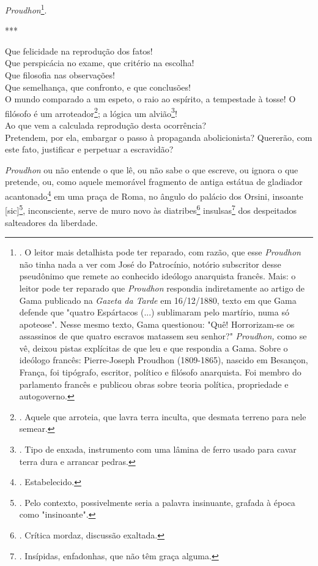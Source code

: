 \emph{Proudhon}\footnote{. O leitor mais detalhista pode ter reparado,
  com razão, que esse \emph{Proudhon} não tinha nada a ver com José do
  Patrocínio, notório subscritor desse pseudônimo que remete ao
  conhecido ideólogo anarquista francês. Mais: o leitor pode ter
  reparado que \emph{Proudhon} respondia indiretamente ao artigo de Gama
  publicado na \emph{Gazeta da Tarde} em 16/12/1880, texto em que Gama
  defende que "quatro Espártacos (...) sublimaram pelo martírio, numa só
  apoteose". Nesse mesmo texto, Gama questionou: "Quê! Horrorizam-se os
  assassinos de que quatro escravos matassem seu senhor?"
  \emph{Proudhon,} como se vê, deixou pistas explícitas de que leu e que
  respondia a Gama. Sobre o ideólogo francês: Pierre-Joseph Proudhon
  (1809-1865), nascido em Besançon, França, foi tipógrafo, escritor,
  político e filósofo anarquista. Foi membro do parlamento francês e
  publicou obras sobre teoria política, propriedade e autogoverno.}.

***

Que felicidade na reprodução dos fatos!\\
Que perspicácia no exame, que critério na escolha!\\
Que filosofia nas observações!\\
Que semelhança, que confronto, e que conclusões!\\
O mundo comparado a um espeto, o raio ao espírito, a tempestade à tosse!
O filósofo é um arroteador\footnote{. Aquele que arroteia, que lavra
  terra inculta, que desmata terreno para nele semear.}; a lógica um
alvião\footnote{. Tipo de enxada, instrumento com uma lâmina de ferro
  usado para cavar terra dura e arrancar pedras.}!\\
Ao que vem a calculada reprodução desta ocorrência?\\
Pretendem, por ela, embargar o passo à propaganda abolicionista?
Quererão, com este fato, justificar e perpetuar a escravidão?

\emph{Proudhon} ou não entende o que lê, ou não sabe o que escreve, ou
ignora o que pretende, ou, como aquele memorável fragmento de antiga
estátua de gladiador acantonado\footnote{. Estabelecido.} em uma praça
de Roma, no ângulo do palácio dos Orsini, insoante {[}sic{]}\footnote{.
  Pelo contexto, possivelmente seria a palavra insinuante, grafada à
  época como "insinoante".}, inconsciente, serve de muro novo às
diatribes\footnote{. Crítica mordaz, discussão exaltada.}
insulsas\footnote{. Insípidas, enfadonhas, que não têm graça alguma.}
dos despeitados salteadores da liberdade.

